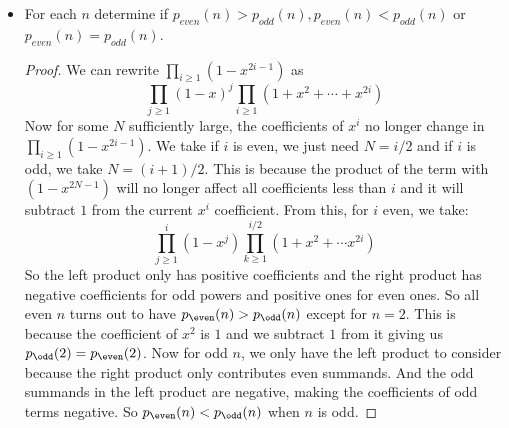 \documentclass{article}
\begin{document}
\begin{itemize}
        \item For each $n$ determine if $p_{even}(n) > p_{odd}(n), p_{even}(n) < p_{odd}(n)$ or $p_{even}(n) = p_{odd}(n)$.
            \begin{proof}
                We can rewrite $\prod_{i\geq 1}(1 - x^{2i - 1})$ as
                    \begin{equation*}
                        \prod_{j \geq 1}(1 - x)^{j}\prod_{i \geq 1}(1 + x^{2} + \cdots + x^{2i})
                    \end{equation*}
                Now for some $N$ sufficiently large, the coefficients of $x^{i}$ no longer change in $\prod_{i \geq 1}(1 - x^{2i -  1})$. We take if $i$ is even, we just need $N = i/2$ and if $i$ is odd, we take $N = (i + 1)/2$. This is because the product of the term with $(1 - x^{2N - 1})$ will no longer affect all coefficients less than $i$ and it will subtract $1$ from the current $x^{i}$ coefficient. From this, for $i$ even, we take:
                    \begin{equation*}
                        \prod_{j \geq 1}^{i}(1 - x^{j})\prod_{k \geq 1}^{i/2} (1 + x^{2} + \cdots x^{2i})
                    \end{equation*}
                So the left product only has positive coefficients and the right product has negative coefficients for odd powers and positive ones for even ones. So all even $n$ turns out to have $p_{\even}(n) > p_{\odd}(n)$ except for $n = 2$. This is because the coefficient of $x^{2}$ is $1$ and we subtract $1$ from it giving us $p_{\odd}(2) = p_{\even}(2)$. Now for odd $n$, we only have the left product to consider because the right product only contributes even summands. And the odd summands in the left product are negative, making the coefficients of odd terms negative. So $p_{\even}(n) <  p_{\odd}(n)$ when $n$ is odd.
            \end{proof}
    \end{itemize}
\end{document}
